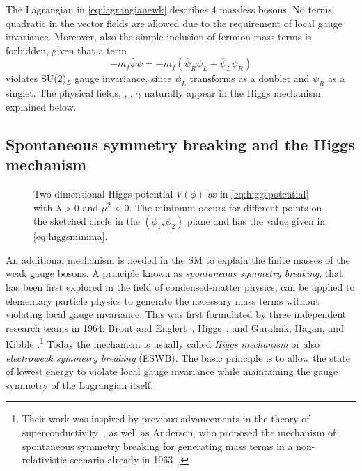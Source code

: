 \noindent The Lagrangian in \cref{eq:lagrangianewk} describes 4 massless bosons. No terms quadratic in the vector fields are allowed due to the requirement of local gauge invariance. Moreover, also the simple inclusion of fermion mass terms is forbidden, given that a term
\begin{equation}
  -m_f \bar{\psi} \psi = -m_f \left( \bar{\psi}_R\psi_L + \bar{\psi}_L\psi_R \right)
  \label{eq:fermionmassterm}
\end{equation}
violates SU(2)$_L$ gauge invariance, since $\psi_L$ transforms as a doublet and $\psi_R$ as a singlet. The physical fields, \Wpm, \Zboson, $\gamma$ naturally appear in the Higgs mechanism explained below.


\subsection{Spontaneous symmetry breaking and the Higgs mechanism}
\label{subsec:ewsymbreaking}
\begin{figure}
  \caption[Two dimensional Higgs potential $V(\phi)$ with $\lambda > 0$ and $\mu^2 < 0$.]{Two dimensional Higgs potential $V(\phi)$ as in \cref{eq:higgspotential} with $\lambda > 0$ and $\mu^2 < 0$. The minimum occurs for different points on the sketched circle in the $(\phi_1, \phi_2)$ plane and has the value given in \cref{eq:higgsminima}.
  }
  \label{fig:higgspotential}
\end{figure}
An additional mechanism is needed in the SM to explain the finite masses of the weak gauge bosons. 
A principle known as \emph{spontaneous symmetry breaking}, that has been first explored in the field of condensed-matter physics, can be applied to elementary particle physics to generate the necessary mass terms without violating local gauge invariance.
This was first formulated by three independent research teams in 1964: Brout and Englert~\cite{PhysRevLett.13.321}, Higgs~\cite{PhysRevLett.13.508,HIGGS1964132}, and Guralnik, Hagan, and Kibble \cite{PhysRevLett.13.585}.\footnote{Their work was inspired by previous advancements in the theory of superconductivity~\cite{PhysRev.108.1175}, as well as Anderson, who proposed the mechanism of spontaneous symmetry breaking for generating mass terms in a non-relativistic scenario already in 1963~\cite{PhysRev.130.439}.}
Today the mechanism is usually called \emph{Higgs mechanism} or also \emph{electroweak symmetry breaking} (ESWB).
The basic principle is to allow the state of lowest energy to violate local gauge invariance while maintaining the gauge symmetry of the Lagrangian itself.

